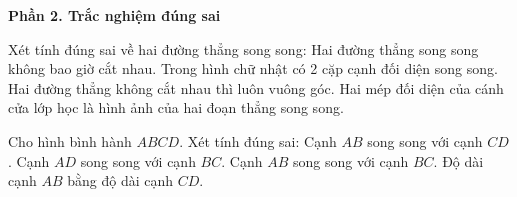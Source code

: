 \textbf{Phần 2. Trắc nghiệm đúng sai}

\begin{ex} %
Xét tính đúng sai về hai đường thẳng song song:
\choiceTF
{\True Hai đường thẳng song song không bao giờ cắt nhau.}
{\True Trong hình chữ nhật có 2 cặp cạnh đối diện song song.}
{Hai đường thẳng không cắt nhau thì luôn vuông góc.}
{\True Hai mép đối diện của cánh cửa lớp học là hình ảnh của hai đoạn thẳng song song.}
\end{ex}

\begin{ex} %
Cho hình bình hành $ABCD$. Xét tính đúng sai:
\choiceTF
{\True Cạnh $AB$ song song với cạnh $CD$.}
{\True Cạnh $AD$ song song với cạnh $BC$.}
{Cạnh $AB$ song song với cạnh $BC$.}
{\True Độ dài cạnh $AB$ bằng độ dài cạnh $CD$.}
\end{ex}

